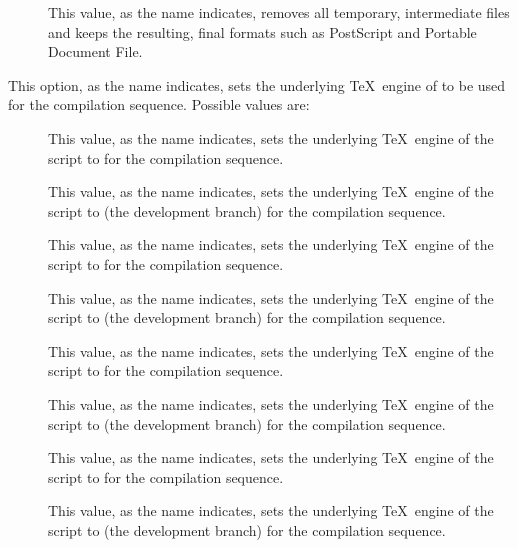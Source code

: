 \begin{description}
\begin{description}
\begin{description}
\item[] This value, as the name indicates, removes all temporary, intermediate files and keeps the resulting, final formats such as PostScript and Portable Document File.
\end{description}

\item[\abox{engine}] This option, as the name indicates, sets the underlying \TeX\ engine of  to be used for the compilation sequence. Possible values are:

\begin{description}
\item[] This value, as the name indicates, sets the underlying \TeX\ engine of the script to  for the compilation sequence.

\item[] This value, as the name indicates, sets the underlying \TeX\ engine of the script to  (the development branch) for the compilation sequence.

\item[] This value, as the name indicates, sets the underlying \TeX\ engine of the script to  for the compilation sequence.

\item[] This value, as the name indicates, sets the underlying \TeX\ engine of the script to  (the development branch) for the compilation sequence.

\item[] This value, as the name indicates, sets the underlying \TeX\ engine of the script to  for the compilation sequence.

\item[] This value, as the name indicates, sets the underlying \TeX\ engine of the script to  (the development branch) for the compilation sequence.

\item[] This value, as the name indicates, sets the underlying \TeX\ engine of the script to  for the compilation sequence.

\item[] This value, as the name indicates, sets the underlying \TeX\ engine of the script to  (the development branch) for the compilation sequence.
\end{description}


\end{description}
\end{description}
